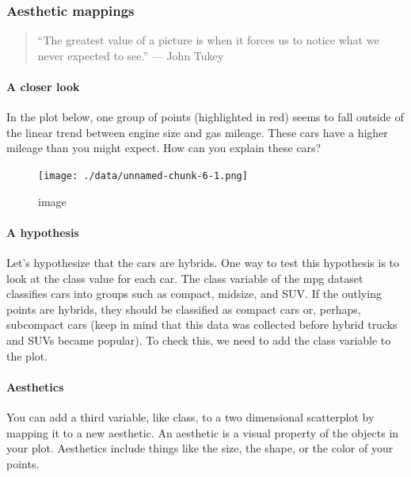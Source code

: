 \documentclass[
]{article}
\begin{document}
\hypertarget{aesthetic-mappings}{%
\subsubsection{Aesthetic mappings}\label{aesthetic-mappings}}

\begin{quote}
``The greatest value of a picture is when it forces us to notice what we
never expected to see.'' --- John Tukey
\end{quote}

\hypertarget{a-closer-look}{%
\paragraph{A closer look}\label{a-closer-look}}

In the plot below, one group of points (highlighted in red) seems to
fall outside of the linear trend between engine size and gas mileage.
These cars have a higher mileage than you might expect. How can you
explain these cars?

\begin{figure}
\centering
\texttt{[image: ./data/unnamed-chunk-6-1.png]}
\caption{image}
\end{figure}

\hypertarget{a-hypothesis}{%
\paragraph{A hypothesis}\label{a-hypothesis}}

Let's hypothesize that the cars are hybrids. One way to test this
hypothesis is to look at the class value for each car. The class
variable of the mpg dataset classifies cars into groups such as compact,
midsize, and SUV. If the outlying points are hybrids, they should be
classified as compact cars or, perhaps, subcompact cars (keep in mind
that this data was collected before hybrid trucks and SUVs became
popular). To check this, we need to add the class variable to the plot.

\hypertarget{aesthetics}{%
\paragraph{Aesthetics}\label{aesthetics}}

You can add a third variable, like class, to a two dimensional
scatterplot by mapping it to a new aesthetic. An aesthetic is a visual
property of the objects in your plot. Aesthetics include things like the
size, the shape, or the color of your points.
\end{document}
